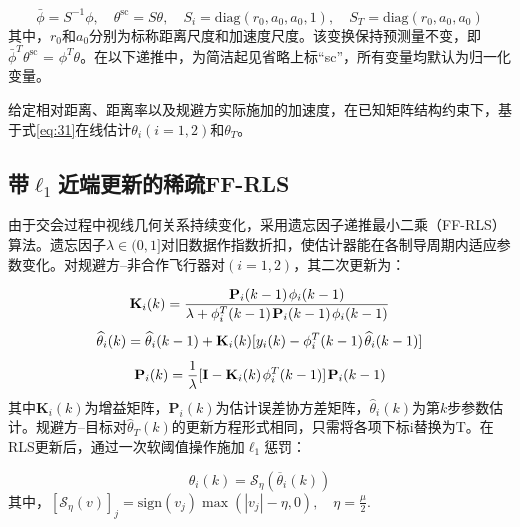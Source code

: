 \begin{equation}
\label{eq:32}
\bar \phi  = {S^{ - 1}}\phi ,\quad {\theta ^{{\text{sc}}}} = S\theta ,\quad {S_i} = {\text{diag}}({r_0},{a_0},{a_0},1),\quad {S_T} = {\text{diag}}({r_0},{a_0},{a_0})
\end{equation}
其中，${r_0}$和${a_0}$分别为标称距离尺度和加速度尺度。该变换保持预测量不变，即${\bar \phi ^T}{\theta ^{{\text{sc}}}}{\text{ = }}{\phi ^T}\theta $。在以下递推中，为简洁起见省略上标“sc”，所有变量均默认为归一化变量。

\begin{problem}[结构稀疏参数辨识]
给定相对距离、距离率以及规避方实际施加的加速度，在已知矩阵结构约束下，基于式\eqref{eq:31}在线估计${\theta _i}(i = 1,2)$和${\theta _T}$。
\end{problem}
\subsection{带${\ell _1}$近端更新的稀疏FF-RLS}
由于交会过程中视线几何关系持续变化，采用遗忘因子递推最小二乘（FF-RLS）算法。遗忘因子$\lambda  \in (0,1]$对旧数据作指数折扣，使估计器能在各制导周期内适应参数变化。对规避方–非合作飞行器对$(i = 1,2)$，其二次更新为：

\begin{equation}
\label{eq:33}
{{\mathbf{K}}_i}(k) = \frac{{{{\mathbf{P}}_i}(k - 1){\kern 1pt} {\phi _i}(k - 1)}}{{\lambda  + \phi _i^T(k - 1){\kern 1pt} {{\mathbf{P}}_i}(k - 1){\kern 1pt} {\phi _i}(k - 1)}}
\end{equation}
\begin{equation}
\label{eq:34}
{\widehat \theta _i}(k) = {\widehat \theta _i}(k - 1) + {{\mathbf{K}}_i}(k)[{y_i}(k) - \phi _i^T(k - 1){\kern 1pt} {\widehat \theta _i}(k - 1)]
\end{equation}
\begin{equation}
\label{eq:35}
{{\mathbf{P}}_i}(k) = \frac{1}{\lambda }[{\mathbf{I}} - {{\mathbf{K}}_i}(k){\kern 1pt} \phi _i^T(k - 1)]{\kern 1pt} {{\mathbf{P}}_i}(k - 1)
\end{equation}
其中${{\mathbf{K}}_i}(k)$为增益矩阵，${{\mathbf{P}}_i}(k)$为估计误差协方差矩阵，${\widehat \theta _i}(k)$为第$k$步参数估计。规避方–目标对${\widehat \theta _T}(k)$的更新方程形式相同，只需将各项下标i替换为T。在RLS更新后，通过一次软阈值操作施加${\ell _1}$惩罚：

\begin{equation}
\label{eq:36}
{\widehat \theta _i}(k) = {\mathcal{S}_\eta }({\overline \theta  _i}(k))
\end{equation}
其中，${[{\mathcal{S}_\eta }(v)]_j} = {\text{sign}}({v_j})\max (|{v_j}| - \eta ,0),\quad \eta  = \frac{\mu }{2}$.

